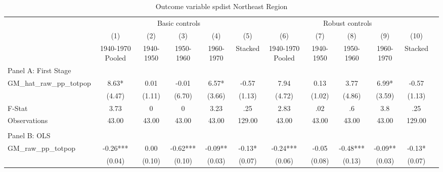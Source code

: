  \begin{table}[htbp]\centering {} \begin{threeparttable} \caption{Outcome variable spdist Northeast Region} \begin{tabular}{l*{11}{c}} \toprule
          &\multicolumn{5}{c}{Basic controls}                                   &\multicolumn{5}{c}{Robust controls}                                  \\\cmidrule(lr){2-6}\cmidrule(lr){7-11}
          &\multicolumn{1}{c}{(1)}&\multicolumn{1}{c}{(2)}&\multicolumn{1}{c}{(3)}&\multicolumn{1}{c}{(4)}&\multicolumn{1}{c}{(5)}&\multicolumn{1}{c}{(6)}&\multicolumn{1}{c}{(7)}&\multicolumn{1}{c}{(8)}&\multicolumn{1}{c}{(9)}&\multicolumn{1}{c}{(10)}\\
          &\multicolumn{1}{c}{1940-1970 Pooled}&\multicolumn{1}{c}{1940-1950}&\multicolumn{1}{c}{1950-1960}&\multicolumn{1}{c}{1960-1970}&\multicolumn{1}{c}{Stacked}&\multicolumn{1}{c}{1940-1970 Pooled}&\multicolumn{1}{c}{1940-1950}&\multicolumn{1}{c}{1950-1960}&\multicolumn{1}{c}{1960-1970}&\multicolumn{1}{c}{Stacked}\\
\cmidrule(lr){1-11}
\multicolumn{10}{l}{Panel A: First Stage}\\
\cmidrule(lr){1-11}
GM\_hat\_raw\_pp\_totpop&      8.63*  &      0.01   &     -0.01   &      6.57*  &     -0.57   &      7.94   &      0.13   &      3.77   &      6.99*  &     -0.57   \\
          &    (4.47)   &    (1.11)   &    (6.70)   &    (3.66)   &    (1.13)   &    (4.72)   &    (1.02)   &    (4.86)   &    (3.59)   &    (1.13)   \\
\midrule
F-Stat    &      3.73   &         0   &         0   &      3.23   &       .25   &      2.83   &       .02   &        .6   &       3.8   &       .25   \\
Observations&     43.00   &     43.00   &     43.00   &     43.00   &    129.00   &     43.00   &     43.00   &     43.00   &     43.00   &    129.00   \\
\cmidrule[\heavyrulewidth](lr){1-11} \\ \cmidrule[\heavyrulewidth](lr){1-11}
\multicolumn{10}{l}{Panel B: OLS}\\
\cmidrule(lr){1-11}
GM\_raw\_pp\_totpop&     -0.26***&      0.00   &     -0.62***&     -0.09** &     -0.13*  &     -0.24***&     -0.05   &     -0.48***&     -0.09** &     -0.13*  \\
          &    (0.04)   &    (0.10)   &    (0.10)   &    (0.03)   &    (0.07)   &    (0.06)   &    (0.08)   &    (0.13)   &    (0.03)   &    (0.07)   \\

\end{tabular}
\end{threeparttable}
\end{table}
